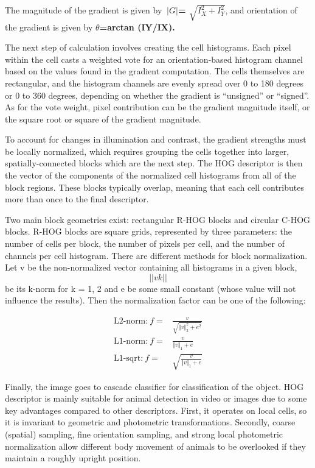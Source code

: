 \documentclass[14pt,a4paper,final]{extreport}
\begin{document}
\item The magnitude of the gradient is given by
\textbf{$\ |G|$= $\sqrt{I^{2}_{X}+I^{2}_{Y}}$},
\newline and orientation of the gradient is given by \textbf{$\theta$=arctan (IY/IX).}
\item The next step of calculation involves creating the cell histograms. Each pixel within the cell casts a weighted vote for an orientation-based histogram channel based on the values found in the gradient computation. 
\newpage The cells themselves are rectangular, and the histogram channels are evenly spread over 0 to 180 degrees or 0 to 360 degrees, depending on whether the gradient is “unsigned” or “signed”. As for the vote weight, pixel contribution can be the gradient magnitude itself, or the square root or square of the gradient magnitude.

\item To account for changes in illumination and contrast, the gradient strengths must be locally normalized, which requires grouping the cells together into larger, spatially-connected blocks which are the next step. The HOG descriptor is then the vector of the components of the normalized cell histograms from all of the block regions. These blocks typically overlap, meaning that each cell contributes more than once to the final descriptor.

\item Two main block geometries exist: rectangular R-HOG blocks and circular C-HOG blocks. R-HOG blocks are square grids, represented by three parameters: the number of cells per block, the number of pixels per cell, and the number of channels per cell histogram. There are different methods for block normalization. Let v be the non-normalized vector containing all histograms in a given block, \[||vk||\] be its k-norm for k = 1, 2 and e be some small constant (whose value will not influence the results). Then the normalization factor can be one of the following:

\begin{align*} \text {L2-norm:}~f=&\frac {v}{\sqrt {\Vert v\Vert ^{2}_{2}+e^{2}}} \\ \text {L1-norm:}~f=&\frac {v}{\Vert v\Vert _{1}+e} \\ \text {L1-sqrt:}~f=&\sqrt {\frac {v}{\Vert v\Vert _{1}+e}} \end{align*}

Finally, the image goes to cascade classifier for classification of the object. HOG descriptor is mainly suitable for animal detection in video or images due to some key advantages compared to other descriptors. First, it operates on local cells, so it is invariant to geometric and photometric transformations. Secondly, coarse (spatial) sampling, fine orientation sampling, and strong local photometric normalization allow different body movement of animals to be overlooked if they maintain a roughly upright position.
\end{document}
